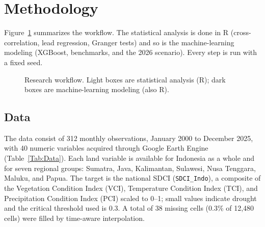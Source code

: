 \documentclass[11pt,twoside]{article}
\begin{document}
\section{Methodology}
\label{Sec:Method}

Figure~\ref{Fig:Pipeline} summarizes the workflow. The statistical analysis is done in R (cross-correlation, lead regression, Granger tests) and so is the machine-learning modeling (XGBoost, benchmarks, and the 2026 scenario). Every step is run with a fixed seed.

\begin{figure}[ht]
\centering
{}
\caption{Research workflow. Light boxes are statistical analysis (R); dark boxes are machine-learning modeling (also R).}
\label{Fig:Pipeline}
\end{figure}

\subsection{Data}
\label{SubSec:Data}

The data consist of 312 monthly observations, January 2000 to December 2025, with 40 numeric variables acquired through Google Earth Engine (Table~\ref{Tab:Data}). Each land variable is available for Indonesia as a whole and for seven regional groups: Sumatra, Java, Kalimantan, Sulawesi, Nusa Tenggara, Maluku, and Papua. The target is the national SDCI (\texttt{SDCI\_Indo}), a composite of the Vegetation Condition Index (VCI), Temperature Condition Index (TCI), and Precipitation Condition Index (PCI) scaled to 0--1; small values indicate drought and the critical threshold used is 0.3. A total of 38 missing cells (0.3\% of 12,480 cells) were filled by time-aware interpolation.
\end{document}
